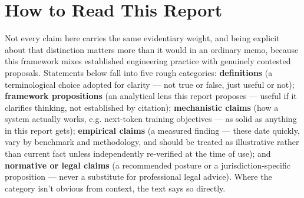 \section{How to Read This Report}

Not every claim here carries the same evidentiary weight, and being explicit about that distinction matters more than it would in an ordinary memo, because this framework mixes established engineering practice with genuinely contested proposals. Statements below fall into five rough categories: \textbf{definitions} (a terminological choice adopted for clarity --- not true or false, just useful or not); \textbf{framework propositions} (an analytical lens this report proposes --- useful if it clarifies thinking, not established by citation); \textbf{mechanistic claims} (how a system actually works, e.g. next-token training objectives --- as solid as anything in this report gets); \textbf{empirical claims} (a measured finding --- these date quickly, vary by benchmark and methodology, and should be treated as illustrative rather than current fact unless independently re-verified at the time of use); and \textbf{normative or legal claims} (a recommended posture or a jurisdiction-specific proposition --- never a substitute for professional legal advice). Where the category isn't obvious from context, the text says so directly.
